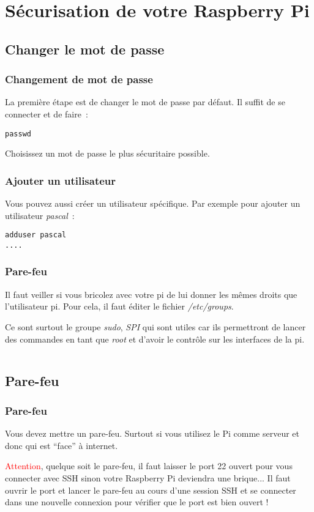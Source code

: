 \section{Sécurisation de votre Raspberry Pi}

\subsection{Changer le mot de passe}

\begin{frame}[containsverbatim]
\frametitle{Changement de mot de passe}

La première étape est de changer le mot de passe par défaut. Il suffit de se connecter et de faire~:
\begin{verbatim}
passwd
\end{verbatim}

Choisissez un mot de passe le plus sécuritaire possible. 
\end{frame}

\begin{frame}[containsverbatim]
\frametitle{Ajouter un utilisateur}

Vous pouvez aussi créer un utilisateur spécifique. Par exemple pour ajouter un utilisateur \emph{pascal}~:
\begin{verbatim}
adduser pascal
....
\end{verbatim}
\end{frame}


\begin{frame}[containsverbatim]
\frametitle{Pare-feu}

Il faut veiller si vous bricolez avec votre pi de lui donner les mêmes droits que l'utilisateur pi. Pour cela, il faut éditer le fichier \emph{/etc/groups}.

Ce sont surtout le groupe \emph{sudo}, \emph{SPI} qui sont utiles car ils permettront de lancer des commandes en tant que \emph{root} et d'avoir le contrôle sur les interfaces de la pi.
\begin{verbatim}

\end{verbatim}

\end{frame}

\subsection{Pare-feu}

\begin{frame}[containsverbatim]
\frametitle{Pare-feu}

Vous devez mettre un pare-feu. Surtout si vous utilisez le Pi comme serveur et donc qui est ``face'' à internet. 

\textcolor{red}{Attention}, quelque soit le pare-feu, il faut laisser le port 22 ouvert pour vous connecter avec SSH sinon votre Raspberry Pi deviendra une brique... Il faut ouvrir le port et lancer le pare-feu au cours d'une session SSH et se connecter dans une nouvelle connexion pour vérifier que le port est bien ouvert !

\end{frame}


